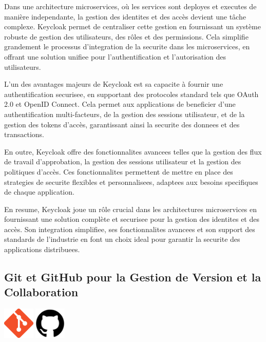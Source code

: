 \documentclass[a4paper, 11pt, openany]{report}
\begin{document}
Dans une architecture microservices, où les services sont deployes et executes de manière independante, la gestion des identites et des accès devient une tâche complexe. Keycloak permet de centraliser cette gestion en fournissant un système robuste de gestion des utilisateurs, des rôles et des permissions. Cela simplifie grandement le processus d'integration de la securite dans les microservices, en offrant une solution unifiee pour l'authentification et l'autorisation des utilisateurs.

L'un des avantages majeurs de Keycloak est sa capacite à fournir une authentification securisee, en supportant des protocoles standard tels que OAuth 2.0 et OpenID Connect. Cela permet aux applications de beneficier d'une authentification multi-facteurs, de la gestion des sessions utilisateur, et de la gestion des tokens d'accès, garantissant ainsi la securite des donnees et des transactions.

En outre, Keycloak offre des fonctionnalites avancees telles que la gestion des flux de travail d'approbation, la gestion des sessions utilisateur et la gestion des politiques d'accès. Ces fonctionnalites permettent de mettre en place des strategies de securite flexibles et personnalisees, adaptees aux besoins specifiques de chaque application.

En resume, Keycloak joue un rôle crucial dans les architectures microservices en fournissant une solution complète et securisee pour la gestion des identites et des accès. Son integration simplifiee, ses fonctionnalites avancees et son support des standards de l'industrie en font un choix ideal pour garantir la securite des applications distribuees.


\subsection{Git et GitHub pour la Gestion de Version et la Collaboration}
\begin{center}
\includegraphics[height=1.5cm]{assets/images/git.png}
\includegraphics[height=1.5cm]{assets/images/github.png}
\end{center}
\end{document}
